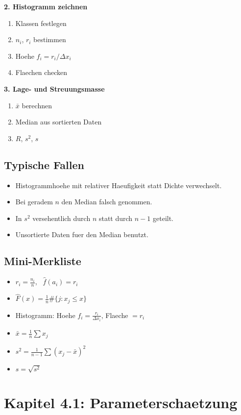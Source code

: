 \documentclass[a4paper,11pt]{article}
\begin{document}
\textbf{2. Histogramm zeichnen}
\begin{enumerate}
  \item Klassen festlegen
  \item $n_i$, $r_i$ bestimmen
  \item Hoehe $f_i=r_i/\Delta x_i$
  \item Flaechen checken
\end{enumerate}

\textbf{3. Lage- und Streuungsmasse}
\begin{enumerate}
  \item $\bar x$ berechnen
  \item Median aus sortierten Daten
  \item $R$, $s^2$, $s$
\end{enumerate}

\subsection{Typische Fallen}
\begin{itemize}
  \item Histogrammhoehe mit relativer Haeufigkeit statt Dichte verwechselt.
  \item Bei geradem $n$ den Median falsch genommen.
  \item In $s^2$ versehentlich durch $n$ statt durch $n-1$ geteilt.
  \item Unsortierte Daten fuer den Median benutzt.
\end{itemize}

\subsection{Mini-Merkliste}
\begin{itemize}
  \item $r_i=\frac{n_i}{n}$, \ $\hat f(a_i)=r_i$
  \item $\hat F(x)=\frac1n\#\{j:x_j\le x\}$
  \item Histogramm: Hoehe $f_i=\frac{r_i}{\Delta x_i}$, Flaeche $=r_i$
  \item $\bar x=\frac1n\sum x_j$
  \item $s^2=\frac{1}{n-1}\sum (x_j-\bar x)^2$
  \item $s=\sqrt{s^2}$
\end{itemize}

\section{Kapitel 4.1: Parameterschaetzung}
\end{document}
